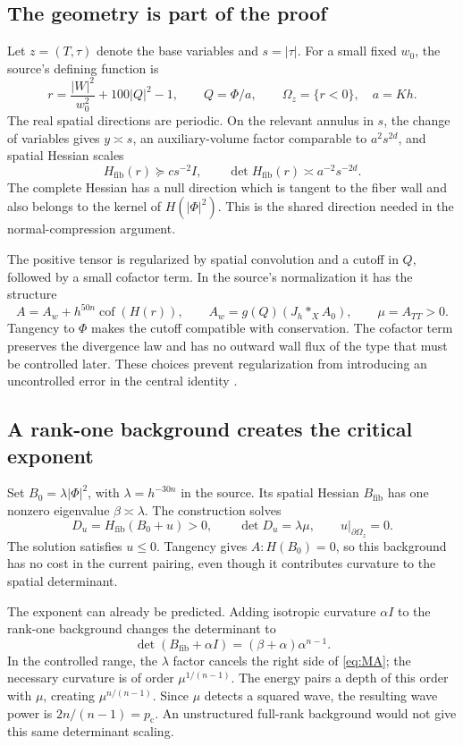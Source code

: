 \documentclass[11pt,a4paper]{article}
\numberwithin{equation}{section}
\theoremstyle{definition}
\theoremstyle{remark}
\newcommand{\pc}{p_{\mathrm c}}
\begin{document}
\subsection{The geometry is part of the proof}
Let $z=(T,\tau)$ denote the base variables and $s=|\tau|$. For a small fixed
$w_0$, the source's defining function is
\begin{equation}\label{eq:fiber}
 r=\frac{|W|^2}{w_0^2}+100|Q|^2-1,
 \qquad Q=\Phi/a,
 \qquad \Omega_z=\{r<0\},\quad a=Kh.
\end{equation}
The real spatial directions are periodic. On the relevant annulus in $s$,
the change of variables gives $y\asymp s$, an auxiliary-volume factor
comparable to $a^2s^{2d}$, and spatial Hessian scales
\[
 H_{\mathrm{fib}}(r)\succeq c s^{-2}I,
 \qquad
 \det H_{\mathrm{fib}}(r)\asymp a^{-2}s^{-2d}.
\]
The complete Hessian has a null direction which is tangent to the fiber wall
and also belongs to the kernel of $H(|\Phi|^2)$. This is the shared direction
needed in the normal-compression argument.

The positive tensor is regularized by spatial convolution and a cutoff in
$Q$, followed by a small cofactor term. In the source's normalization it has
the structure
\[
 A=A_w+h^{50n}\operatorname{cof}(H(r)),\qquad
 A_w=g(Q)(J_h*_X A_0),\qquad \mu=A_{TT}>0.
\]
Tangency to $\Phi$ makes the cutoff compatible with conservation. The cofactor
term preserves the divergence law and has no outward wall flux of the type
that must be controlled later. These choices prevent regularization from
introducing an uncontrolled error in the central identity \cite{energy}.

\subsection{A rank-one background creates the critical exponent}
Set $B_0=\lambda|\Phi|^2$, with $\lambda=h^{-30n}$ in the source. Its spatial
Hessian $B_{\mathrm{fib}}$ has one nonzero eigenvalue $\beta\asymp\lambda$.
The construction solves
\begin{equation}\label{eq:MA}
 D_u=H_{\mathrm{fib}}(B_0+u)>0,
 \qquad \det D_u=\lambda\mu,
 \qquad u|_{\partial\Omega_z}=0.
\end{equation}
The solution satisfies $u\le0$. Tangency gives $A:H(B_0)=0$, so this background
has no cost in the current pairing, even though it contributes curvature to
the spatial determinant.

The exponent can already be predicted. Adding isotropic curvature $\alpha I$
to the rank-one background changes the determinant to
\begin{equation}\label{eq:rankone}
 \det(B_{\mathrm{fib}}+\alpha I)=(\beta+\alpha)\alpha^{n-1}.
\end{equation}
In the controlled range, the $\lambda$ factor cancels the right side of
\eqref{eq:MA}; the necessary curvature is of order $\mu^{1/(n-1)}$.
The energy pairs a depth of this order with $\mu$, creating
$\mu^{n/(n-1)}$. Since $\mu$ detects a squared wave, the resulting wave
power is $2n/(n-1)=\pc$. An unstructured full-rank background would not give
this same determinant scaling.
\end{document}
